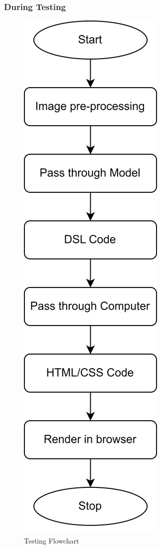 \documentclass{ioereport}
\begin{document}
\subsubsection{During Testing}
 \begin{figure}[H]
 \centering
        \includegraphics[scale=1.5]{images/testing flowchart.png}
        \caption{Testing Flowchart}
        \label{fig:flowtr}
    \end{figure}
\end{document}
